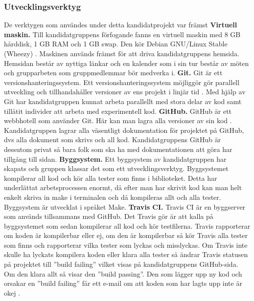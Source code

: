 \subsubsection{Utvecklingsverktyg}
De verktygen som användes under detta kandidatprojekt var främst
\newline
\newline
\textbf{Virtuell maskin.} Till kandidatgruppens förfogande fanns en virtuell maskin med 8 GB hårddisk, 1 GB RAM och 1 GB swap. Den kör Debian GNU/Linux Stable (Wheezy) \citep{wheezy}. Maskinen används främst för att driva kandidatgruppens hemsida. Hemsidan består av nyttiga länkar och en kalender som i sin tur består av möten och grupparbeten som gruppmedlemmar bör medverka i.
\newline
\newline 
\textbf{Git.} Git är ett versionshanteringssystem. Ett versionshanteringssystem möjliggör gör parallell utveckling och tillhandahåller versioner av ens projekt i linjär tid \citep{git}. Med hjälp av Git har kandidatgruppen kunnat arbeta parallellt med stora delar av kod samt tillåtit individer att arbeta med experimentell kod.
\newline
\newline 
\textbf{GitHub.} GitHub är ett webbhotell som använder Git. Här kan man lagra alla versioner av sin kod \citep{github}. Kandidatgruppen lagrar alla väsentligt dokumentation för projektet på GitHub, dvs alla dokument som skrivs och all kod. Kandidatgruppens GitHub är dessutom privat så bara folk som ska ha med dokumentationen att göra har tillgång till sidan.
\newline
\newline
\textbf{Byggsystem.} Ett byggsystem av kandidatgruppen har skapats och gruppen klassar det som ett utvecklingsverktyg. Byggsystemet kompilerar all kod och kör alla tester som finns i biblioteket. Detta har underlättat arbetsprocessen enormt, då efter man har skrivit kod kan man helt enkelt skriva in make i terminalen och då kompileras allt och alla tester. Byggsystem är utvecklat i språket Make.
\newline
\newline 
\textbf{Travis CI.} Travis CI är en byggserver som används tillsammans med GitHub. Det Travis gör är att kalla på byggsystemet som sedan kompilerar all kod och kör testfilerna. Travis rapporterar om koden är kompilerbar eller ej, om den är kompilerbar så kör Travis alla tester som finns och rapporterar vilka tester som lyckas och misslyckas. Om Travis inte skulle ha lyckats kompilera koden eller klara alla tester så ändrar Travis statusen på projektet till ''build failing'' vilket visas på kandidatgruppens GitHub-sida. Om den klara allt så visar den ''build passing''. Den som lägger upp ny kod och orsakar en ''build failing'' får ett e-mail om att koden som har lagts upp inte är okej \citep{travisinfo}.
